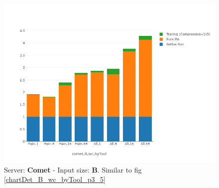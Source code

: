 \begin{figure}[!t]
\centering
\includegraphics[width=5in]{figs.comet/comet_chartDet_B_wc_byTool_p3_5.png}
\caption{Server: \textbf{Comet} - Input size: \textbf{B}. Similar to fig \ref{chartDet_B_wc_byTool_p3_5}}
\label{comet_chartDet_B_wc_byTool_p3_5}
\end{figure}
